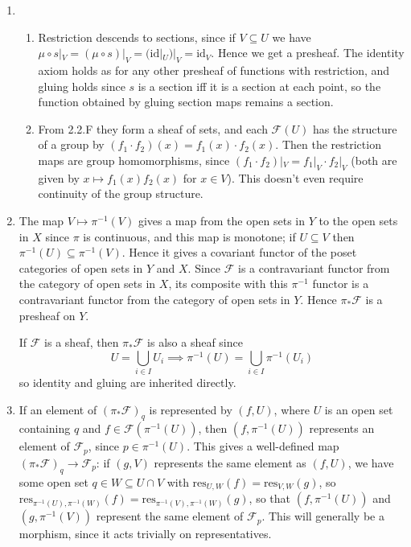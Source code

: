 \documentclass{report}
\newcommand{\id}{{\mathrm{id}}} %
\newcommand{\res}{{\mathrm{res}}} %
\newcommand{\scrF}{\mathscr{F}}
\begin{document}
\begin{enumerate}[label=\textbf{2.2.\Alph*.}]
	\item
	      \begin{enumerate}[label=(\alph*)]
		      \item Restriction descends to sections, since if $V\subseteq U$ we
		            have $\mu\circ s|_V = (\mu\circ s)|_V=(\id|_U)|_V=\id_V$. Hence
		            we get a presheaf. The identity axiom holds as for any other
		            presheaf of functions with restriction, and gluing holds since
		            $s$ is a section iff it is a section at each point, so the
		            function obtained by gluing section maps remains a section.

		      \item From 2.2.F they form a sheaf of sets, and each $\scrF(U)$ has the
		            structure of a group by $(f_1\cdot f_2)(x)=f_1(x)\cdot f_2(x)$.
		            Then the restriction maps are group homomorphisms, since
		            $(f_1\cdot f_2)|_V=f_1|_V\cdot f_2|_V$ (both are given by
		            $x\mapsto f_1(x)f_2(x)$ for $x\in V$). This doesn't even require
		            continuity of the group structure.
	      \end{enumerate}

	\item The map $V\mapsto\pi^{-1}(V)$ gives a map from the open sets in $Y$ to
	      the open sets in $X$ since $\pi$ is continuous, and this map is monotone;
	      if $U\subseteq V$ then $\pi^{-1}(U)\subseteq\pi^{-1}(V)$. Hence it gives
	      a covariant functor of the poset categories of open sets in $Y$ and $X$.
	      Since $\scrF$ is a contravariant functor from the category of open sets in
	      $X$, its composite with this $\pi^{-1}$ functor is a contravariant
	      functor from the category of open sets in $Y$. Hence $\pi_*\scrF$ is a
	      presheaf on $Y$.

	      If $\scrF$ is a sheaf, then $\pi_*\scrF$ is also a sheaf since
	      \begin{equation*}
		      U=\bigcup_{i\in I}U_i \implies \pi^{-1}(U)=\bigcup_{i\in I}\pi^{-1}(U_i)
	      \end{equation*}
	      so identity and gluing are inherited directly.

	\item If an element of $(\pi_*\scrF)_q$ is represented by $(f,U)$, where $U$ is
	      an open set containing $q$ and $f\in\scrF(\pi^{-1}(U))$, then
	      $(f,\pi^{-1}(U))$ represents an element of $\scrF_p$, since
	      $p\in\pi^{-1}(U)$. This gives a well-defined map $(\pi_*\scrF)_q\to\scrF_p$:
	      if $(g,V)$ represents the same element as $(f,U)$, we have some
	      open set $q\in W\subseteq U\cap V$ with $\res_{U,W}(f)=\res_{V,W}(g)$,
	      so $\res_{\pi^{-1}(U),\pi^{-1}(W)}(f)=\res_{\pi^{-1}(V),\pi^{-1}(W)}(g)$,
	      so that $(f,\pi^{-1}(U))$ and $(g,\pi^{-1}(V))$ represent the same
	      element of $\scrF_p$. This will generally be a morphism, since it acts
	      trivially on representatives.


\end{enumerate}
\end{document}
